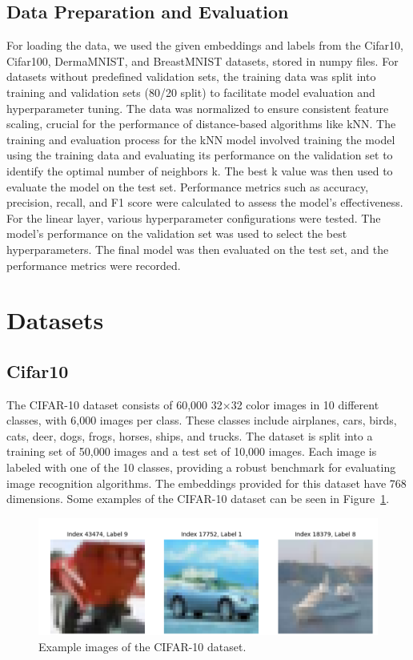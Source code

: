 \documentclass[a4paper]{article}
\begin{document}
\subsection{Data Preparation and Evaluation}
For loading the data, we used the given embeddings and labels from the Cifar10, Cifar100, DermaMNIST, and BreastMNIST datasets, stored in numpy files. For datasets without predefined validation sets, the training data was split into training and validation sets (80/20 split) to facilitate model evaluation and hyperparameter tuning. The data was normalized to ensure consistent feature scaling, crucial for the performance of distance-based algorithms like kNN\@. The training and evaluation process for the kNN model involved training the model using the training data and evaluating its performance on the validation set to identify the optimal number of neighbors k. The best k value was then used to evaluate the model on the test set. Performance metrics such as accuracy, precision, recall, and F1 score were calculated to assess the model's effectiveness. For the linear layer, various hyperparameter configurations were tested. The model's performance on the validation set was used to select the best hyperparameters. The final model was then evaluated on the test set, and the performance metrics were recorded.

\section{Datasets}\label{datasets}

\subsection{Cifar10}\label{cifar10}
The CIFAR-10 dataset \citep{Krizhevsky2009} consists of 60,000 32×32 color images in 10 different classes, with 6,000 images per class. These classes include airplanes, cars, birds, cats, deer, dogs, frogs, horses, ships, and trucks. The dataset is split into a training set of 50,000 images and a test set of 10,000 images. Each image is labeled with one of the 10 classes, providing a robust benchmark for evaluating image recognition algorithms. The embeddings provided for this dataset have 768 dimensions. Some examples of the CIFAR-10 dataset can be seen in Figure~\ref{fig:cifar10}.

\begin{figure}[h]
  \centering
  \includegraphics[width=0.5\linewidth]{images/cifar10_images.png}
  \caption{Example images of the CIFAR-10 dataset.}\label{fig:cifar10}
\end{figure}
\end{document}
